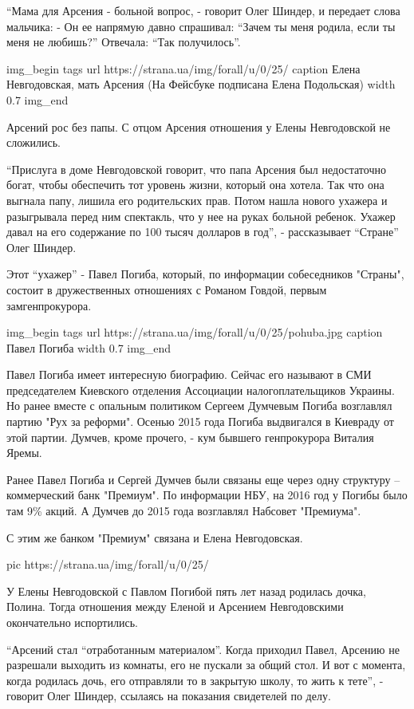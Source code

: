 “Мама для Арсения - больной вопрос, - говорит Олег Шиндер, и передает слова
мальчика: - Он ее напрямую давно спрашивал: “Зачем ты меня родила, если ты меня
не любишь?” Отвечала: “Так получилось”. 

\ifcmt
img_begin 
	tags 
	url https://strana.ua/img/forall/u/0/25/%
	caption Елена Невгодовская, мать Арсения (На Фейсбуке подписана Елена Подольская) 
	width 0.7
img_end
\fi

Арсений рос без папы. С отцом Арсения отношения у Елены Невгодовской не
сложились. 

“Прислуга в доме Невгодовской говорит, что папа Арсения был недостаточно богат,
чтобы обеспечить тот уровень жизни, который она хотела. Так что она выгнала
папу, лишила его родительских прав. Потом нашла нового ухажера и разыгрывала
перед ним спектакль, что у нее на руках больной ребенок. Ухажер давал на его
содержание по 100 тысяч долларов в год”, - рассказывает “Стране” Олег Шиндер. 

Этот “ухажер” - Павел Погиба, который, по информации собеседников "Страны",
состоит в дружественных отношениях с Романом Говдой, первым замгенпрокурора. 

\ifcmt
img_begin 
	tags 
	url https://strana.ua/img/forall/u/0/25/pohuba.jpg
	caption Павел Погиба
	width 0.7
img_end
\fi

Павел Погиба имеет интересную биографию. Сейчас его называют в СМИ
председателем Киевского отделения Ассоциации налогоплательщиков Украины. Но
ранее вместе с опальным политиком Сергеем Думчевым Погиба возглавлял партию
"Рух за реформи". Осенью 2015 года Погиба выдвигался в Киевраду от этой партии.
Думчев, кроме прочего, - кум бывшего генпрокурора Виталия Яремы.

Ранее Павел Погиба и Сергей Думчев были связаны еще через одну структуру –
коммерческий банк "Премиум". По информации НБУ, на 2016 год у Погибы было там
9\% акций. А Думчев до 2015 года возглавлял Набсовет "Премиума". 

С этим же банком "Премиум" связана и Елена Невгодовская.

\ifcmt
pic https://strana.ua/img/forall/u/0/25/%
\fi

У Елены Невгодовской с Павлом Погибой пять лет назад родилась дочка, Полина.
Тогда отношения между Еленой и Арсением Невгодовскими окончательно испортились.

“Арсений стал “отработанным материалом”. Когда приходил Павел, Арсению не
разрешали выходить из комнаты, его не пускали за общий стол. И вот с момента,
когда родилась дочь, его отправляли то в закрытую школу, то жить к тете”, -
говорит Олег Шиндер, ссылаясь на показания свидетелей по делу. 


